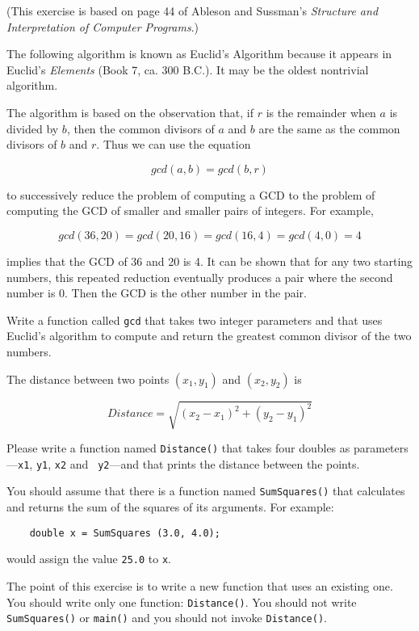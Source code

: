 \begin{exercise}

\label{gcd}
(This exercise is based on page 44 of Ableson and Sussman's
{\em Structure and Interpretation of Computer Programs}.)

The following algorithm is known as Euclid's Algorithm because
it appears in Euclid's {\em Elements} (Book 7, ca. 300 B.C.).
It may be the oldest nontrivial algorithm.

The algorithm is based on the observation that, if $r$ is the
remainder when $a$ is divided by $b$, then the common divisors
of $a$ and $b$ are the same as the common divisors of $b$ and $r$.
Thus we can use the equation

\[ gcd (a, b) = gcd (b, r) \]

to successively reduce the problem of computing a GCD to the
problem of computing the GCD of smaller and smaller pairs of integers.
For example,

\[ gcd (36, 20) = gcd (20, 16) = gcd (16, 4) = gcd (4, 0) = 4\]

implies that the GCD of 36 and 20 is 4.  It can be shown
that for any two starting numbers, this repeated reduction eventually
produces a pair where the second number is 0.  Then the GCD is the
other number in the pair.

Write a function called {\tt gcd} that takes two integer parameters and
that uses Euclid's algorithm to compute and return the greatest
common divisor of the two numbers.
\end{exercise}




%

\begin{exercise}
The distance between two points $(x_1, y_1)$ and $(x_2, y_2)$
is

\[Distance = \sqrt{(x_2 - x_1)^2 + (y_2 - y_1)^2} \]

Please write a function named {\tt Distance()} that takes four
doubles as parameters---{\tt x1}, {\tt y1}, {\tt x2} and {\tt
y2}---and that prints the distance between the points.

You should assume that there is a function named {\tt SumSquares()}
that calculates and returns the sum of the squares of its arguments.
For example:

\begin{verbatim}
    double x = SumSquares (3.0, 4.0);
\end{verbatim}
%
would assign the value {\tt 25.0} to {\tt x}.

The point of this exercise is to write a new function that uses an
existing one.  You should write only one function: {\tt Distance()}.  You
should not write {\tt SumSquares()} or {\tt main()} and you should not
invoke {\tt Distance()}.
\end{exercise}


